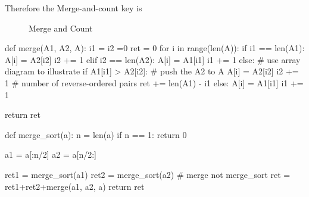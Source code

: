 Therefore the Merge-and-count key is 

\begin{figure}[hbtp]
\centering
{}
\caption{Merge and Count}
\label{fig:mergeAndSort}
\end{figure}

\begin{python}
def merge(A1, A2, A):
  i1 = i2 =0
  ret = 0
  for i in range(len(A)):
    if i1 == len(A1):
      A[i] = A2[i2]
      i2 += 1
    elif i2 == len(A2):
      A[i] = A1[i1]
      i1 += 1
    else:
      # use array diagram to illustrate
      if A1[i1] > A2[i2]:  # push the A2 to A
        A[i] = A2[i2]
        i2 += 1
        # number of reverse-ordered pairs
        ret += len(A1) - i1
      else:
        A[i] = A1[i1]
        i1 += 1

  return ret

def merge_sort(a):
  n = len(a)
  if n == 1:
    return 0

  a1 = a[:n/2]
  a2 = a[n/2:]

  ret1 = merge_sort(a1)
  ret2 = merge_sort(a2)
  # merge not merge_sort
  ret = ret1+ret2+merge(a1, a2, a)  
  return ret
\end{python}
